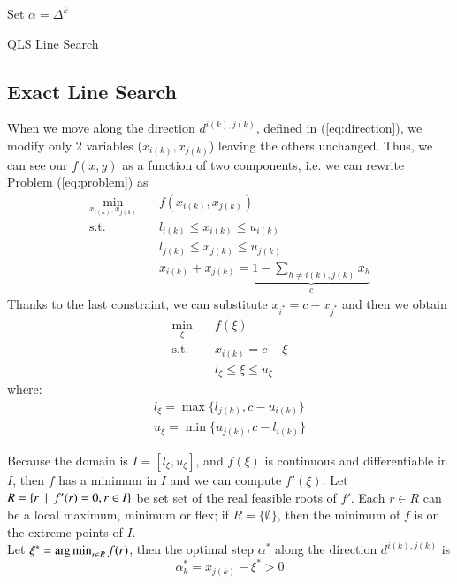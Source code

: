  \begin{algorithm}[ht]
 Set $\alpha = \Delta^{k}$\\
 \caption{QLS Line Search}
\end{algorithm}

\subsection{Exact Line Search}
When we move along the direction $d^{i(k),j(k)}$, defined in (\ref{eq:direction}), we modify only 2 variables ($x_{i(k)}, x_{j(k)}$) leaving the others unchanged. Thus, we can see our $f(x,y)$ as a function of two components, i.e. we can rewrite Problem (\ref{eq:problem}) as
\begin{subequations}\label{eq:twocomp} 
\begin{align}
\min_{x_{i(k)}, x_{j(k)}} & \quad f(x_{i(k)}, x_{j(k)})  \\
\text{s.t.} & \quad l_{i(k)} \leq x_{i(k)}  \leq u_{i(k)} \\
& \quad l_{j(k)} \leq x_{j(k)}  \leq u_{j(k)} \\
& \quad x_{i(k)}+x_{j(k)} = \underbrace{1-\sum_{h\ne {i(k)},{j(k)}}x_h}_c
\end{align}
\end{subequations}
Thanks to the last constraint, we can substitute $x_{i^*} = c - x_{j^*}$ and then we obtain
\begin{subequations}\label{eq:onecomp} 
\begin{align}
\min_{\xi} & \quad f(\xi) \\
\text{s.t.} & \quad x_{i(k)} = c - \xi \\
& \quad l_{\xi} \leq \xi \leq u_{\xi}
\end{align}
\end{subequations}
where:
\begin{equation}
\begin{aligned}
 l_{\xi} = \max\{l_{j(k)}, c - u_{i(k)}\}\\
 u_{\xi}= \min \{ u_{j(k)}, c-l_{i(k)}\}  
 \end{aligned}
\end{equation}

Because the domain is $I=[l_{\xi}, u_{\xi}]$, and $f(\xi)$ is continuous and differentiable in $I$, then $f$ has a minimum in $I$ and we can compute $f'(\xi)$. Let $R = \{ r \enskip | \enskip f'(r) = 0, r \in I \}$ be set set of the real feasible roots of $f'$. Each $r \in R$ can be a local maximum, minimum or flex; if $R = \{ \emptyset \}$, then the minimum of $f$ is on the extreme points of $I$.\\ 
Let $\xi^* = \operatorname*{arg\,min}_{r \in R} f(r)$, then the optimal step $\alpha^*$ along the direction $d^{i(k),j(k)}$ is
\begin{equation}
\alpha_k^* = x_{j(k)} - \xi^* > 0
\end{equation} 
